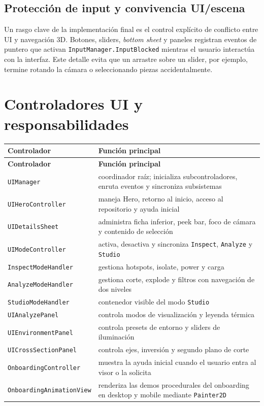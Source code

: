 \documentclass[12pt,letterpaper]{article}
\begin{document}
\subsection{Protección de input y convivencia UI/escena}
Un rasgo clave de la implementación final es el control explícito de conflicto entre UI y navegación 3D. Botones, sliders, \textit{bottom sheet} y paneles registran eventos de puntero que activan \texttt{InputManager.InputBlocked} mientras el usuario interactúa con la interfaz. Este detalle evita que un arrastre sobre un slider, por ejemplo, termine rotando la cámara o seleccionando piezas accidentalmente.

\section{Controladores UI y responsabilidades}

\begin{longtable}{p{5.3cm}p{7.7cm}}
\toprule
\textbf{Controlador} & \textbf{Función principal} \\
\midrule
\endfirsthead
\toprule
\textbf{Controlador} & \textbf{Función principal} \\
\midrule
\endhead
\texttt{UIManager} & coordinador raíz; inicializa subcontroladores, enruta eventos y sincroniza subsistemas \\
\texttt{UIHeroController} & maneja Hero, retorno al inicio, acceso al repositorio y ayuda inicial \\
\texttt{UIDetailsSheet} & administra ficha inferior, peek bar, foco de cámara y contenido de selección \\
\texttt{UIModeController} & activa, desactiva y sincroniza \texttt{Inspect}, \texttt{Analyze} y \texttt{Studio} \\
\texttt{InspectModeHandler} & gestiona hotspots, isolate, power y carga \\
\texttt{AnalyzeModeHandler} & gestiona corte, explode y filtros con navegación de dos niveles \\
\texttt{StudioModeHandler} & contenedor visible del modo \texttt{Studio} \\
\texttt{UIAnalyzePanel} & controla modos de visualización y leyenda térmica \\
\texttt{UIEnvironmentPanel} & controla presets de entorno y sliders de iluminación \\
\texttt{UICrossSectionPanel} & controla ejes, inversión y segundo plano de corte \\
\texttt{OnboardingController} & muestra la ayuda inicial cuando el usuario entra al visor o la solicita \\
\texttt{OnboardingAnimationView} & renderiza las demos procedurales del onboarding en desktop y mobile mediante \texttt{Painter2D} \\
\bottomrule
\end{longtable}
\end{document}
